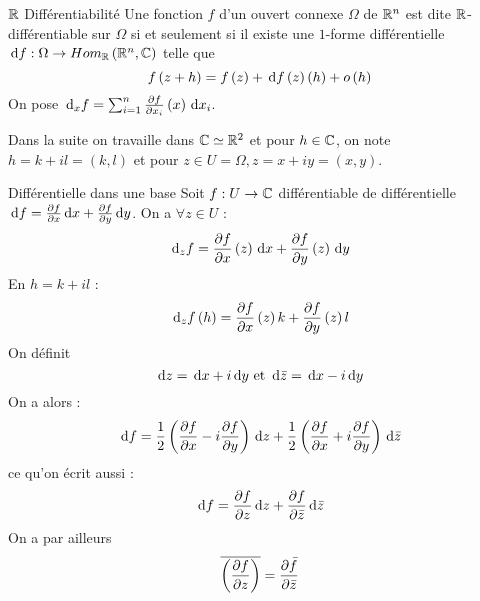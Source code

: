 \documentclass{cours}
\begin{document}
\begin{définition}{$\mathbb{R}$ Différentiabilité}{}
	Une fonction $f$ d'un ouvert connexe $\Omega$ de $\mathbb{R}^{n}$ est dite $\mathbb{R}$-différentiable sur $ \Omega$ si et seulement si il existe une $1$-forme différentielle ${\rm \, d} f : \Omega \to Hom_{\mathbb{R}}\left(\mathbb{R}^{n}, \mathbb{C}\right)$ telle que 
	\begin{equation*}
		f\left(z + h\right) = f\left(z\right) + {\rm \, d} f\left(z\right)\left(h\right) + o\left(h\right)
	\end{equation*}
	On pose ${\rm \, d}_{x}f = \sum_{i = 1}^{n}\frac{\partial f}{\partial x_{i}}\left(x\right){\rm \, d} x_{i}$.
\end{définition}

Dans la suite on travaille dans $\mathbb{C} \simeq \mathbb{R}^{2}$ et pour $h \in \mathbb{C}$, on note $h = k + il = \left(k, l\right)$ et pour $z \in U = \Omega, z = x+ iy = \left(x, y\right)$.

\begin{propositionfr}{Différentielle dans une base}{}
	Soit $f : U \to \mathbb{C}$ différentiable de différentielle ${\rm \, d} f = \frac{\partial f}{\partial x}{\rm \, d} x + \frac{\partial f}{\partial y} {\rm \, d} y$. On a $\forall z \in U$ : 
	\begin{equation*}	
		{\rm \, d}_{z}f = \frac{\partial f}{\partial x}\left(z\right){\rm \, d} x + \frac{\partial f}{\partial y}\left(z\right) {\rm \, d} y
	\end{equation*}
	En $h = k + il$ : 
	\begin{equation*}
		{\rm \, d}_{z}f\left(h\right) = \frac{\partial f}{\partial x}\left(z\right)k + \frac{\partial f}{\partial y}\left(z\right)l
	\end{equation*}
	On définit 
	\begin{equation*}
		{\rm \, d} z = {\rm \, d} x + i{\rm \, d} y \text{ et } {\rm \, d}\bar{z} = {\rm \, d} x - i{\rm \, d} y
	\end{equation*}
	On a alors : 
	\begin{equation*}	
		{\rm \, d} f = \frac{1}{2}\left(\frac{\partial f}{\partial x} - i\frac{\partial f}{\partial y}\right){\rm \, d} z + \frac{1}{2}\left(\frac{\partial f}{\partial x} + i\frac{\partial f}{\partial y}\right){\rm \, d}\bar{z}
	\end{equation*}
	ce qu'on écrit aussi : 
	\begin{equation*}	
		{\rm \, d} f = \frac{\partial f}{\partial z}{\rm \, d} z + \frac{\partial f}{\partial \bar{z}}{\rm \, d}\bar{z}
	\end{equation*}
	On a par ailleurs 
	\begin{equation*}
		\overline{\left(\frac{\partial f}{\partial z}\right)} = \frac{\partial \bar{f}}{\partial \bar{z}}
	\end{equation*}
\end{propositionfr}
\end{document}
